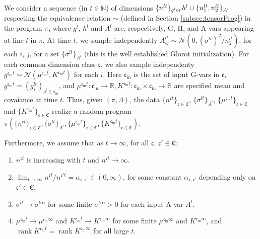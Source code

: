 \documentclass[11pt,notitlepage]{article}
\numberwithin{equation}{section}
\def\R{{\mathbb{R}}}
\def\normdist{\mathcal{N}}
\DeclareMathOperator{\rank}{rank}
\theoremstyle{remark}
\theoremstyle{definition}
\begin{document}
	We consider a sequence (in $t \in \mathbb{N}$) of dimensions $\{n^{lt}\}_{g^l\text or }h^l \cup \{n_1^{lt}, n_2^{lt}\}_{A^l}$ respecting the equivalence relation $\sim$ (defined in Section \ref{subsec:tensorProg}) in the program $\pi$, where $g^l$, $h^l$ and $A^l$ are, respectively, G, H, and A-vars appearing at line $l$ in $\pi$.
	At time $t$, we sample independently $A^{lt}_{ij} \sim \normdist(0, (\sigma^{lt})^2/n_2^{lt})$, for each $i$, $j$, for a set $\{\sigma^{lt} \}_{A^l}$ (this is the well established Glorot initialization).
	For each common dimension class $\mathfrak{c}$, we also sample independenty $g^{\mathfrak{c}_{\text{in}}t} \sim \normdist(\mu^{\mathfrak{c}_{\text{in}}t}, K^{\mathfrak{c}_{\text{in}}t})$ for each $i$.
	Here $\mathfrak{c}_{\text{in}}$ is the set of input G-vars in $\mathfrak{c}$, $g^{\mathfrak{c}_{\text{in}}t} = (g^{lt}_i)_{g^l \in \mathfrak{c}_{\text{in}}}$, and $\mu^{\mathfrak{c}_{\text{in}}t}: \mathfrak{c}_{\text{in}} \rightarrow \R, K^{\mathfrak{c}_{\text{in}}t}: \mathfrak{c}_{\text{in}} \times \mathfrak{c}_{\text{in}} \rightarrow \R$ are specified mean and covaiance at time $t$.
	Thus, given $(\pi, \Lambda)$, the data $\{n^{\mathfrak{c}t}\}_{\mathfrak{c} \in \mathfrak{C}}$, $\{\sigma^{lt}\}_{A^l}$, $\{\mu^{\mathfrak{c}_{\text{in}}t}\}_{\mathfrak{c} \in \mathfrak{C}}$ and $\{K^{\mathfrak{c}_{\text{in}}t}\}_{\mathfrak{c} \in \mathfrak{C}}$ realize a random program $\pi(\{n^{\mathfrak{c}t}\}_{\mathfrak{c} \in \mathfrak{C}}, \{\sigma^{lt}\}_{A^l}, \{\mu^{\mathfrak{c}_{\text{in}}t}\}_{\mathfrak{c} \in \mathfrak{C}}, \{K^{\mathfrak{c}_{\text{in}}t}\}_{\mathfrak{c} \in \mathfrak{C}})$.
	
	Furthermore, we assume that as $t \rightarrow \infty$, for all $\mathfrak{c}$, $\mathfrak{c}' \in \mathfrak{C}$:
	\begin{enumerate}[itemsep=0em, topsep=3pt]
		\item $n^{\mathfrak{c}t}$ is increasing with $t$ and $n^{\mathfrak{c}t} \rightarrow \infty$.
		\item $\lim_{t \rightarrow \infty} n^{\mathfrak{c}t} / n^{\mathfrak{c}'t} = \alpha_{\mathfrak{c}, \mathfrak{c}'} \in (0, \infty)$, for some constant $\alpha_{\mathfrak{c}, \mathfrak{c}'}$ depending only on $\mathfrak{c}' \in \mathfrak{C}$.
		\item $\sigma^{lt} \rightarrow \sigma^{l\infty}$ for some finite $\sigma^{l\infty} > 0$ for each input A-var $A^l$.
		\item $\mu^{\mathfrak{c}_{\text{in}}t} \rightarrow \mu^{\mathfrak{c}_{\text{in}}\infty}$ and $K^{\mathfrak{c}_{\text{in}}t} \rightarrow K^{\mathfrak{c}_{\text{in}}\infty}$ for some finite $\mu^{\mathfrak{c}_{\text{in}}\infty}$ and $K^{\mathfrak{c}_{\text{in}}\infty}$, and $\rank K^{\mathfrak{c}_{\text{in}}t} = \rank K^{\mathfrak{c}_{\text{in}}\infty}$ for all large $t$.
	\end{enumerate}
	
\end{document}
